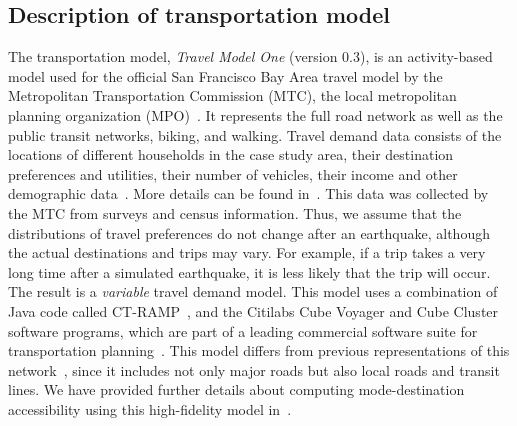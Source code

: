 \subsection{Description of transportation model}
The transportation model, \emph{Travel Model One} (version 0.3), is an activity-based model used for the official San Francisco Bay Area travel model by the Metropolitan Transportation Commission (MTC), the local metropolitan planning organization (MPO)~\cite{erhardt_mtcs_2012}. It represents the full road network as well as the public transit networks, biking, and walking. Travel demand data consists of the locations of different households in the case study area, their destination preferences and utilities, their number of vehicles, their income and other demographic data~\cite{erhardt_mtcs_2012,ory_personal_2013}. More details can be found in~\cite{waddell_urbansim:_2002}. This data was collected by the MTC from surveys and census information. Thus, we assume that the distributions of travel preferences do not change after an earthquake, although the actual destinations and trips may vary. For example, if a trip takes a very long time after a simulated earthquake, it is less likely that the trip will occur. The result is a \emph{variable} travel demand model. This model uses a combination of Java code called CT-RAMP~\cite{davidson_ct-ramp_2010}, and the Citilabs Cube Voyager and Cube Cluster software programs, which are part of a leading commercial software suite for transportation planning~\cite{erhardt_mtcs_2012}. This model differs from previous representations of this network~\cite[e.g.,][]{jayaram_efficient_2010,wakabayashi_network_1992}, since it includes not only major roads but also local roads and transit lines. We have provided further details about computing mode-destination accessibility using this high-fidelity model in~\cite{miller_seismic_2014}.



